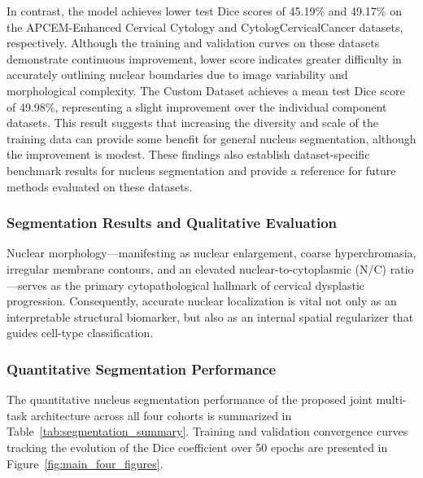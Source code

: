 \documentclass[pdflatex,sn-nature]{sn-jnl}%
\theoremstyle{thmstyleone}%
\theoremstyle{thmstyletwo}%
\theoremstyle{thmstylethree}%
\begin{document}
In contrast, the model achieves lower test Dice scores of 45.19\% and 49.17\% on the APCEM-Enhanced Cervical Cytology and CytologCervicalCancer datasets, respectively. Although the training and validation curves on these datasets demonstrate continuous improvement, lower score indicates greater difficulty in accurately outlining nuclear boundaries due to image variability and morphological complexity. The Custom Dataset achieves a mean test Dice score of 49.98\%, representing a slight improvement over the individual component datasets. This result suggests that increasing the diversity and scale of the training data can provide some benefit for general nucleus segmentation, although the improvement is modest. These findings also establish dataset-specific benchmark results for nucleus segmentation and provide a reference for future methods evaluated on these datasets.

\subsubsection{Segmentation Results and Qualitative Evaluation}
\label{sec:segmentation_results}

Nuclear morphology—manifesting as nuclear enlargement, coarse hyperchromasia, irregular membrane contours, and an elevated nuclear-to-cytoplasmic (N/C) ratio—serves as the primary cytopathological hallmark of cervical dysplastic progression. Consequently, accurate nuclear localization is vital not only as an interpretable structural biomarker, but also as an internal spatial regularizer that guides cell-type classification.

\subsubsection{Quantitative Segmentation Performance}
The quantitative nucleus segmentation performance of the proposed joint multi-task architecture across all four cohorts is summarized in Table~\ref{tab:segmentation_summary}. Training and validation convergence curves tracking the evolution of the Dice coefficient over 50 epochs are presented in Figure~\ref{fig:main_four_figures}.
\end{document}
